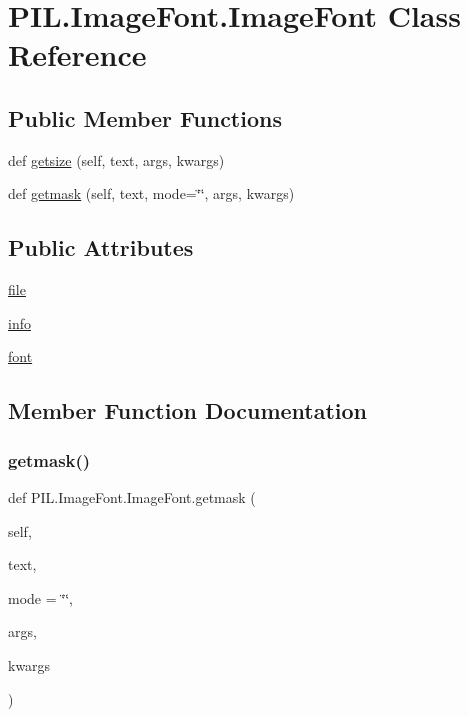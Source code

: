 \hypertarget{classPIL_1_1ImageFont_1_1ImageFont}{}\section{P\+I\+L.\+Image\+Font.\+Image\+Font Class Reference}
\label{classPIL_1_1ImageFont_1_1ImageFont}
\subsection*{Public Member Functions}
\begin{DoxyCompactItemize}
\item 
def \hyperlink{classPIL_1_1ImageFont_1_1ImageFont_addde416540e28d46d1de2d9c5ca65f51}{getsize} (self, text, args, kwargs)
\item 
def \hyperlink{classPIL_1_1ImageFont_1_1ImageFont_a444999f042037ba69ee7b75c4a60cd5b}{getmask} (self, text, mode=\char`\"{}\char`\"{}, args, kwargs)
\end{DoxyCompactItemize}
\subsection*{Public Attributes}
\begin{DoxyCompactItemize}
\item 
\hyperlink{classPIL_1_1ImageFont_1_1ImageFont_a98d1d26b27442a20e03d4365f5bf6e66}{file}
\item 
\hyperlink{classPIL_1_1ImageFont_1_1ImageFont_a5f49b01a25de59a70874489684e76dbe}{info}
\item 
\hyperlink{classPIL_1_1ImageFont_1_1ImageFont_a5ed0f69eb8834c2fd158b4f43d822530}{font}
\end{DoxyCompactItemize}


\subsection{Member Function Documentation}
\mbox{\label{classPIL_1_1ImageFont_1_1ImageFont_a444999f042037ba69ee7b75c4a60cd5b}} 
\subsubsection{\texorpdfstring{getmask()}{getmask()}}
{\footnotesize\ttfamily def P\+I\+L.\+Image\+Font.\+Image\+Font.\+getmask (\begin{DoxyParamCaption}\item[{}]{self,  }\item[{}]{text,  }\item[{}]{mode = {\ttfamily \char`\"{}\char`\"{}},  }\item[{}]{args,  }\item[{}]{kwargs }\end{DoxyParamCaption})}

